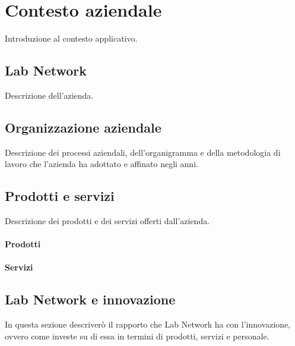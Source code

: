 
\chapter{Contesto aziendale}
\label{cap:introduzione}

Introduzione al contesto applicativo.\\

\section{Lab Network}
Descrizione dell'azienda.

\section{Organizzazione aziendale}
Descrizione dei processi aziendali, dell'organigramma e della metodologia di lavoro che l'azienda ha adottato e affinato negli anni.


\section{Prodotti e servizi}
Descrizione dei prodotti e dei servizi offerti dall'azienda.
\subsubsection{Prodotti}

\subsubsection{Servizi}

\section{Lab Network e innovazione}
In questa sezione descriverò il rapporto che Lab Network ha con l'innovazione, ovvero come investe su di essa in termini di prodotti, servizi e personale.